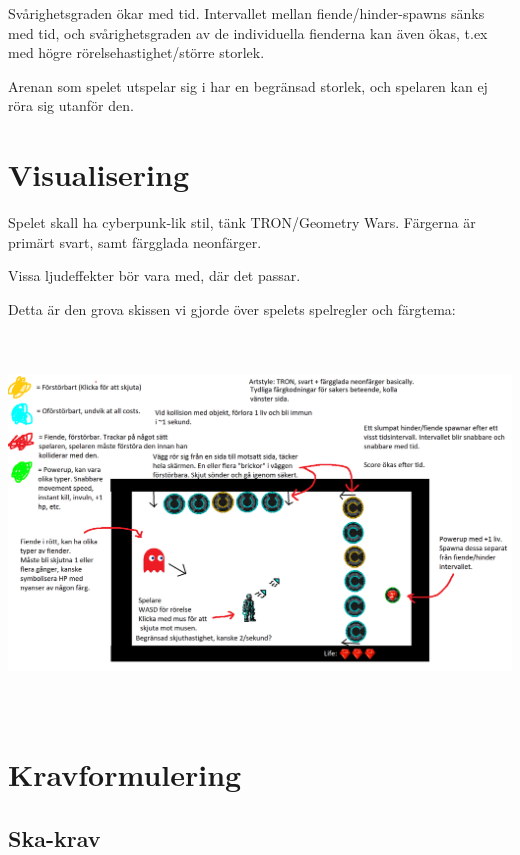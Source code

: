 \documentclass{TDP005mall}
\begin{document}
Svårighetsgraden ökar med tid. Intervallet mellan fiende/hinder-spawns sänks med tid, och svårighetsgraden av de individuella fienderna kan även ökas, t.ex med högre rörelsehastighet/större storlek.

Arenan som spelet utspelar sig i har en begränsad storlek, och spelaren kan ej röra sig utanför den.

\section{Visualisering}
Spelet skall ha cyberpunk-lik stil, tänk TRON/Geometry Wars. Färgerna är primärt svart, samt färgglada neonfärger.

Vissa ljudeffekter bör vara med, där det passar.

Detta är den grova skissen vi gjorde över spelets spelregler och färgtema:

\includegraphics[height=10cm]{sketch.png}

\section{Kravformulering}
\subsection{Ska-krav}
\end{document}
